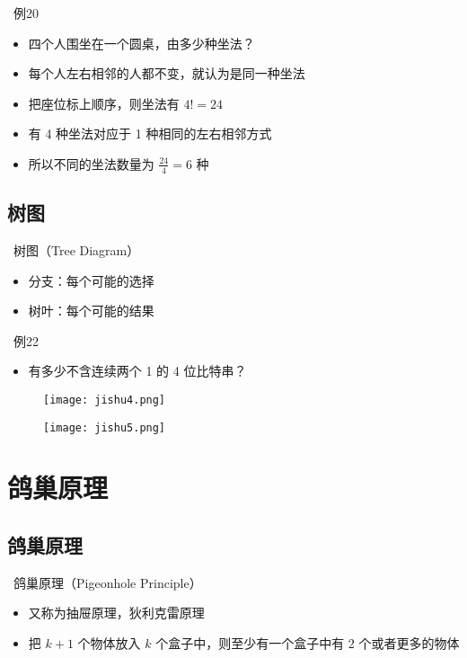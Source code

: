 \documentclass[UTF8]{report}
\theoremstyle{MyLineTheoremStyle} %
\theoremstyle{MyBlockTheoremStyle} %
\theoremstyle{MySubsubsectionStyle} %
\begin{document}
\textbullet\ 例20
\begin{itemize}
    \item 四个人围坐在一个圆桌，由多少种坐法？
    \item 每个人左右相邻的人都不变，就认为是同一种坐法
    \item 把座位标上顺序，则坐法有 $4! = 24$
    \item 有 4 种坐法对应于 1 种相同的左右相邻方式
    \item 所以不同的坐法数量为 $\frac{24}{4} = 6$ 种
\end{itemize}

\subsection{树图}
\textbullet\ 树图（Tree Diagram）
\begin{itemize}
    \item 分支：每个可能的选择
    \item 树叶：每个可能的结果
\end{itemize}

\textbullet\ 例22
\begin{itemize}
    \item 有多少不含连续两个 1 的 4 位比特串？
\end{itemize}

\begin{figure}[H]
    \centering
    \texttt{[image: jishu4.png]}
\end{figure}

\begin{figure}[H]
    \centering
    \texttt{[image: jishu5.png]}
\end{figure}

\section{鸽巢原理}

\subsection{鸽巢原理}
\textbullet\ 鸽巢原理（Pigeonhole Principle）
\begin{itemize}
    \item 又称为抽屉原理，狄利克雷原理
    \item 把 $k + 1$ 个物体放入 $k$ 个盒子中，则至少有一个盒子中有 2 个或者更多的物体
\end{itemize}
\end{document}
